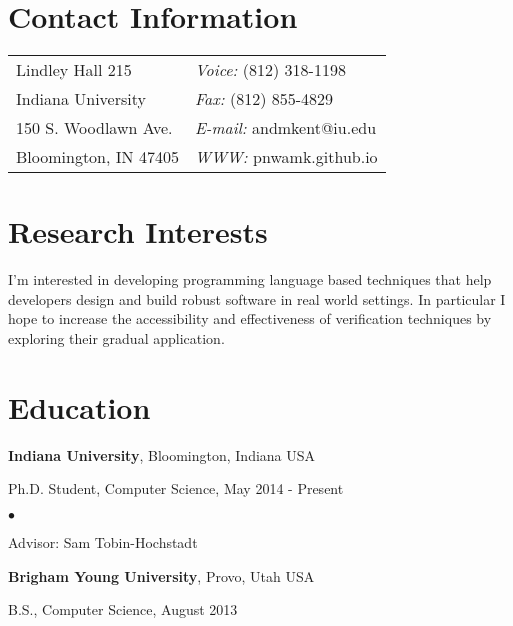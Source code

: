 \documentclass[margin,line]{res}
\newenvironment{list1}{
  \begin{list}{\ding{113}}{%
      \setlength{\itemsep}{0in}
      \setlength{\parsep}{0in} \setlength{\parskip}{0in}
      \setlength{\topsep}{0in} \setlength{\partopsep}{0in} 
      \setlength{\leftmargin}{0.17in}}}{\end{list}}
\newenvironment{list2}{
  \begin{list}{$\bullet$}{%
      \setlength{\itemsep}{0in}
      \setlength{\parsep}{0in} \setlength{\parskip}{0in}
      \setlength{\topsep}{0in} \setlength{\partopsep}{0in} 
      \setlength{\leftmargin}{0.2in}}}{\end{list}}
\begin{document}

\begin{resume}
\section{\sc Contact Information}
\vspace{.05in}
\begin{tabular}{@{}p{2in}p{4in}}
Lindley Hall 215            & {\it Voice:}  (812) 318-1198 \\            
Indiana University         & {\it Fax:}    (812) 855-4829 \\         
150 S. Woodlawn Ave.   & {\it E-mail:}  andmkent@iu.edu\\       
Bloomington, IN 47405 & {\it WWW:} pnwamk.github.io \\     
\end{tabular}


\section{\sc Research Interests}
I'm interested in developing programming language based techniques
that help developers design and build robust software in real world
settings.  In particular I hope to increase the accessibility and
effectiveness of verification techniques by exploring their gradual
application.
\section{\sc Education}
{\bf Indiana University}, Bloomington, Indiana USA\\
\vspace*{-.1in}
\begin{list1}
\item[] Ph.D. Student, Computer Science, May 2014 - Present
\begin{list2}
\vspace*{.05in}
\item Advisor:  Sam Tobin-Hochstadt
\end{list2}
\end{list1}

{\bf Brigham Young University}, Provo, Utah USA\\
\vspace*{-.1in}
\begin{list1}
\item[] B.S., Computer Science, August 2013
\end{list1}


\end{resume}
\end{document}
